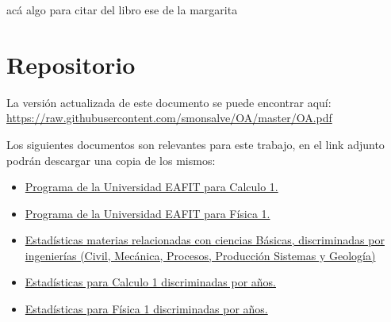 \documentclass[twoside,letterpaper,11pt]{report}
\begin{document}
acá algo para citar del libro ese de la margarita\cite{5seg}





\newpage

\appendix
\chapter{Repositorio}

La versión actualizada de este documento se puede encontrar aquí:\\
 \url{https://raw.githubusercontent.com/smonsalve/OA/master/OA.pdf}

Los siguientes documentos son relevantes para este trabajo, en el link adjunto podrán descargar una copia de los mismos:

\begin{itemize}

	\item 	\href{https://github.com/smonsalve/OA/blob/master/Apendices/1%20CB0240pdf.pdf?raw=true}
	{Programa de la Universidad EAFIT para Calculo 1.}

	\item 	\href{https://github.com/smonsalve/OA/blob/master/Apendices/1%20CB0236pdf.pdf?raw=true}
	{Programa de la Universidad EAFIT para Física 1.}

	\item \href{https://github.com/smonsalve/OA/blob/master/Apendices/EstadisticasDepuradas.xlsx?raw=true}
	{Estadísticas materias relacionadas con ciencias Básicas, discriminadas por ingenierías (Civil, Mecánica, Procesos, Producción Sistemas y Geología)}

	\item \href{https://github.com/smonsalve/OA/blob/master/Apendices/Calculo1.xlsx?raw=true}
	{Estadísticas para Calculo 1 discriminadas por años.}

	\item \href{https://github.com/smonsalve/OA/blob/master/Apendices/Fisica1.xlsx?raw=true}
	{Estadísticas para Física 1 discriminadas por años.}

\end{itemize}
\end{document}
